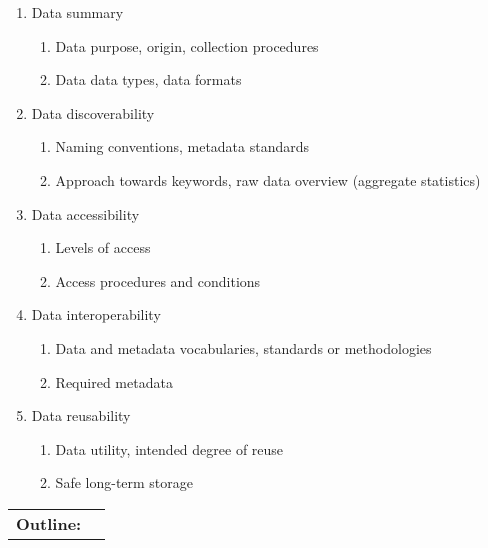 \documentclass{article}
\begin{document}
%
%
 
\begin{enumerate}
  \item Data summary
      \begin{enumerate}
       \item Data purpose, origin, collection procedures
       \item Data data types, data formats
   \end{enumerate}
   \item Data discoverability
  \begin{enumerate}
  \item Naming conventions, metadata standards
  \item Approach towards keywords, raw data overview (aggregate statistics)
   \end{enumerate}
  \item Data accessibility
  \begin{enumerate}
  \item Levels of access
  \item Access procedures and conditions
  \end{enumerate}
   \item Data interoperability
  \begin{enumerate}
  \item Data and metadata vocabularies, standards or methodologies 
  \item Required metadata 
   \end{enumerate}
    \item Data reusability
      \begin{enumerate}
   \item Data utility, intended degree of reuse
  \item Safe long-term storage
  \end{enumerate} 
\end{enumerate}

\newpage

\begin{table}[h]
  \begin{tabular}{ll}
\textbf{Outline:}  &   \\ 
\end{tabular}
\end{table}
\end{document}
